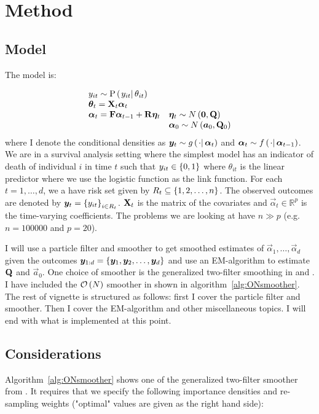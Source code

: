 \section{Method}
\subsection*{Model}
The model is:

\begin{equation}
\begin{array}{ll}
 	y_{it} \sim \propC{y_{it}}{\theta_{it}} & \\
%
 	\vec{\theta}_{t} = \mat{X}_t\vec{\alpha}_t \\
% 
 	\vec{\alpha}_t = \mat{F}\vec{\alpha}_{t - 1} + \mat{R}\vec{\eta}_t &
 		\vec{\eta}_t \sim N\Lparen{\vec{0}, \mat{Q}} \\
%
	&	\vec{\alpha}_0 \sim N\Lparen{\vec{a}_0, \mat{Q}_0}
 \end{array}
\end{equation}%
%
where I  denote the conditional densities as $\vec{y}_t \sim \optorC{g}{\cdot}{\vec{\alpha}_t}$ and $\vec{\alpha}_t \sim \optorC{f}{\cdot}{\vec{\alpha}_{t-1}}$. We are in a survival analysis setting where the simplest model has an indicator of death of individual $i$ in time $t$ such that $y_{it} \in \left\{ 0, 1\right\}$ where $\theta_{it}$ is the linear predictor where we use the logistic function as the link function. For each $t=1,\dots,d$, we a have risk set given by $R_t \subseteq \left\{ 1,2,\dots,n\right\}$. The observed outcomes are denoted by $\bm{y}_t = \left\{ y_{it}\right\}_{i \in R_t}$. $\mathbf{X}_t$ is the matrix of the covariates and $\vec{\alpha}_t \in \mathbb{R}^p$ is the time-varying coefficients. The problems we are looking at have $n \gg p$ (e.g. $n = 100000$ and $p = 20$). 

I will use a particle filter and smoother to get smoothed estimates of $\vec{\alpha}_1, \dots, \vec{\alpha}_d$ given the outcomes $\bm{y}_{1:d} = \left\{ \bm{y}_1,\bm{y}_2,\dots, \bm{y}_d\right\}$ and use an EM-algorithm to estimate $\mathbf{Q}$ and $\vec{a}_0$. One choice of smoother is the generalized two-filter smoothing in \cite{fearnhead10} and \cite{briers10}. I have included the $\mathcal{O}\left( N\right)$ smoother in \cite{fearnhead10} shown in algorithm~\ref{alg:ONsmoother}. The rest of vignette is structured as follows: first I cover the particle filter and smoother. Then I cover the EM-algorithm and other miscellaneous topics. I will end with what is implemented at this point.

\subsection*{Considerations}
Algorithm~\ref{alg:ONsmoother} shows one of the generalized two-filter smoother from \cite{fearnhead10}. It requires that we specify the following importance densities and re-sampling weights ("optimal" values are given as the right hand side):

